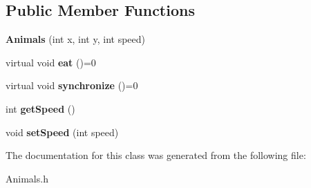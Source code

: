 \subsection*{Public Member Functions}
\begin{DoxyCompactItemize}
\item 
\mbox{\label{class_animals_ac1a5ca3b403377125688fdc8687db721}} 
{\bfseries Animals} (int x, int y, int speed)
\item 
\mbox{\label{class_animals_adbd7dbb6d8bd178fc983dbaf34ff0c41}} 
virtual void {\bfseries eat} ()=0
\item 
\mbox{\label{class_animals_a38b3b917bcd3e7af6e408ae91a1e51ab}} 
virtual void {\bfseries synchronize} ()=0
\item 
\mbox{\label{class_animals_a04d055b9a5a78eecd78cb6715a3ba32b}} 
int {\bfseries get\+Speed} ()
\item 
\mbox{\label{class_animals_a2efba71e156ee08d8e16099ab59de23c}} 
void {\bfseries set\+Speed} (int speed)
\end{DoxyCompactItemize}


The documentation for this class was generated from the following file\+:\begin{DoxyCompactItemize}
\item 
Animals.\+h\end{DoxyCompactItemize}
